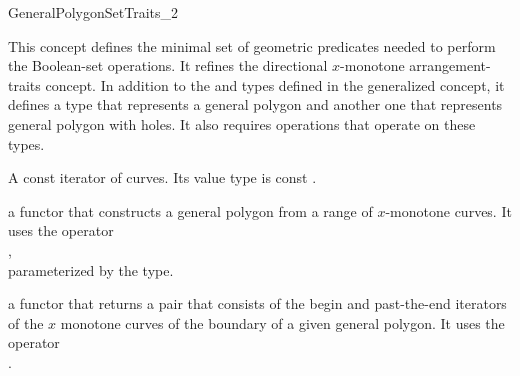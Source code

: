 \ccRefPageBegin

\begin{ccRefConcept}{GeneralPolygonSetTraits_2}

\ccThreeToTwo

\ccDefinition
This concept defines the minimal set of geometric predicates needed to
perform the Boolean-set operations. It refines the directional $x$-monotone
arrangement-traits concept. In addition to the  and
 types defined in the generalized concept, it defines
a type that represents a general polygon and another one that represents
general polygon with holes. It also requires operations that operate on these
types.

\ccRefines
{}

\ccTypes

\ccGlue
{}

{A const iterator of curves. Its value type is const
.}


\ccThreeToTwo

{a functor that constructs a general polygon from a range of
$x$-monotone curves. It uses the operator\\
 , \\
 parameterized by the  type.}

{a functor that returns a pair that consists of the begin and
 past-the-end iterators of the $x$ monotone curves of the boundary of
 a given general polygon. It uses the operator\\
 .}
  

\end{ccRefConcept}
